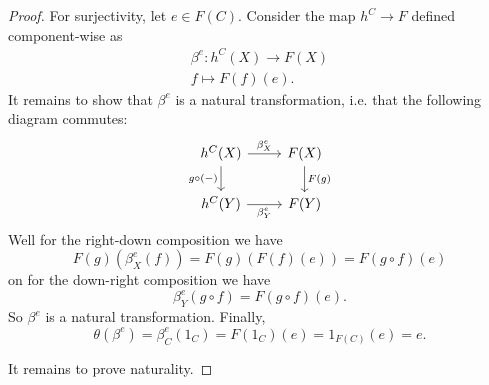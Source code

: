 \documentclass[12pt]{article}
\begin{document}
\begin{proof}
	For surjectivity, let $e\in F(C)$. Consider the map $h^C\to F$ defined component-wise as 
	\begin{gather*}
		\beta^e: h^C(X) \to F(X) \\
		f \mapsto F(f)(e).
	\end{gather*}
	It remains to show that $\beta^e$ is a natural transformation, i.e. that the following diagram commutes:
	\begin{equation*}
\begin{tikzcd}
h^C(X) \arrow[r, "\beta^e_X"] \arrow[d, "g\circ (-)"'] & F(X) \arrow[d, "F(g)"] \\
h^C(Y) \arrow[r, "\beta^e_Y"']                         & F(Y)                  
\end{tikzcd}
	\end{equation*}
	Well for the right-down composition we have 
	\begin{equation*}
		F(g)(\beta^e_X(f)) = F(g)(F(f)(e)) = F(g\circ f)(e)
	\end{equation*}
	on for the down-right composition we have 
	\begin{equation*}
		\beta^e_Y(g\circ f) = F(g\circ f)(e).
	\end{equation*}
	So $\beta^e$ is a natural transformation. Finally, 
	\begin{equation*}
		\theta(\beta^e) = \beta^e_C(1_C)=F(1_C)(e)=1_{F(C)}(e)=e.
	\end{equation*}

	It remains to prove naturality. 


\end{proof}
\end{document}
